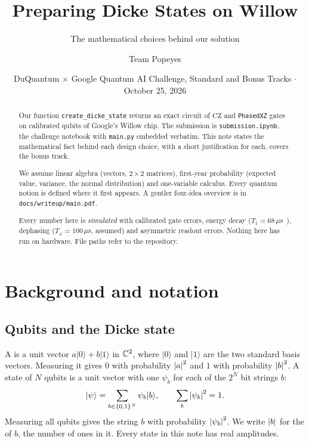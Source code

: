 \documentclass[11pt]{scrartcl}
\title{Preparing Dicke States on Willow}
\subtitle{The mathematical choices behind our solution}
\author{Team Popeyes}
\date{DuQuantum $\times$ Google Quantum AI Challenge, Standard and Bonus Tracks $\cdot$ October 25, 2026}
\newcommand{\ket}[1]{\lvert #1\rangle}
\newcommand{\CZ}{\ensuremath{\mathrm{CZ}}}
\newcommand{\file}[1]{\texttt{\small #1}}
\begin{document}
\maketitle

\begin{abstract}
  Our function \file{create\_dicke\_state} returns an exact circuit of \CZ{} and \texttt{PhasedXZ}
  gates on calibrated qubits of Google's Willow chip. The submission is \file{submission.ipynb}, the
  challenge notebook with \file{main.py} embedded verbatim. This note states the mathematical fact
  behind each design choice, with a short justification for each.  covers the
  bonus track.

  We assume linear algebra (vectors, $2\times2$ matrices), first-year probability (expected value,
  variance, the normal distribution) and one-variable calculus. Every quantum notion is defined
  where it first appears. A gentler four-idea overview is in \file{docs/writeup/main.pdf}.

  Every number here is \emph{simulated} with calibrated gate errors, energy decay
  ($T_1=68\,\mu$s~\cite{willow}), dephasing ($T_\varphi=100\,\mu$s, assumed) and asymmetric readout
  errors. Nothing here has run on hardware. File paths refer to the repository.
\end{abstract}

\section{Background and notation}

\subsection{Qubits and the Dicke state}

A  is a unit vector $a\ket0+b\ket1$ in $\mathbb C^2$, where $\ket0$ and $\ket1$ are the two
standard basis vectors. Measuring it gives $0$ with probability $\left\lvert a \right\rvert^2$ and $1$ with probability
$\left\lvert b \right\rvert^2$. A state of $N$ qubits is a unit vector with one  $\psi_b$ for each of
the $2^N$ bit strings $b$:
\[
  \ket\psi=\sum_{b\in\{0,1\}^N}\psi_b\ket b,\qquad \sum_b\abs{\psi_b}^2=1 .
\]
Measuring all qubits gives the string $b$ with probability $\left\lvert \psi_b \right\rvert^2$. We write $\left\lvert b \right\rvert$ for
the  of $b$, the number of ones in it. Every state in this note has real amplitudes.
\end{document}
